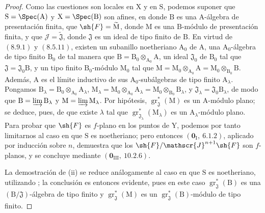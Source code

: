 \begin{proof}
Como las cuestiones son locales en $\mathrm{X}$ y en $\mathrm{S}$, podemos suponer que
$\mathrm{S}=\Spec(\mathrm{A})$ y $\mathrm{X}=\Spec(\mathrm{B})$ son afines,
en donde $\mathrm{B}$ es una $\mathrm{A}$-álgebra de presentación finita, que
$\sh{F}=\widetilde{\mathrm{M}}$, donde $\mathrm{M}$ es una
$\mathrm{B}$-módulo de presentación finita, y que
$\mathscr{J}=\widetilde{\mathfrak{J}}$, donde $\mathfrak{J}$ es un ideal
de tipo finito de $\mathrm{B}$. En virtud de $(8.9.1)$ y $(8.5.11)$,
existen un subanillo noetheriano $\mathrm{A}_0$ de $\mathrm{A}$, una
$\mathrm{A}_0$-álgebra de tipo finito $\mathrm{B}_0$ de tal manera que
$\mathrm{B}=\mathrm{B}_0\otimes_{\mathrm{A}_0}\mathrm{A}$, un ideal
$\mathfrak{J}_0$ de $\mathrm{B}_0$ tal que
$\mathfrak{J}=\mathfrak{J}_0\mathrm{B}$, y un tipo finito
$\mathrm{B}_0$-módulo $\mathrm{M}_0$ tal que
$\mathrm{M}=\mathrm{M}_0\otimes_{\mathrm{A}_0}\mathrm{A}
=\mathrm{M}_0\otimes_{\mathrm{B}_0}\mathrm{B}$. Además,
$\mathrm{A}$ es el límite inductivo de sus
$\mathrm{A}_0$-subálgebras de tipo finito $\mathrm{A}_\lambda$. Pongamos
$\mathrm{B}_\lambda=\mathrm{B}_0\otimes_{\mathrm{A}_0}\mathrm{A}_\lambda$,
$\mathrm{M}_\lambda=\mathrm{M}_0\otimes_{\mathrm{A}_0}\mathrm{A}_\lambda
=\mathrm{M}_0\otimes_{\mathrm{B}_0}\mathrm{B}_\lambda$, y
$\mathfrak{J}_\lambda=\mathfrak{J}_0\mathrm{B}_\lambda$, de modo que
$\mathrm{B}=\varinjlim\mathrm{B}_\lambda$ y
$\mathrm{M}=\varinjlim\mathrm{M}_\lambda$. Por hipótesis,
$\operatorname{gr}^*_\mathfrak{J}(\mathrm{M})$ es un
$\mathrm{A}$-módulo plano; se deduce, pues, de  que
existe $\lambda$ tal que
$\operatorname{gr}^*_{\mathfrak{J}_\lambda}(\mathrm{M}_\lambda)$ es un
$\mathrm{A}_\lambda$-módulo plano. Para probar que $\sh{F}$ es $f$-plano en
los puntos de $\mathrm{Y}$, podemos por tanto limitarnos al caso en que
$\mathrm{S}$ es noetheriano; pero entonces $(\mathbf{0}_\mathrm{I},~6.1.2)$,
aplicado por inducción sobre $n$, demuestra que los
$\sh{F}/\mathscr{J}^{n+1}\sh{F}$ son $f$-planos, y se concluye mediante
$(\mathbf{0}_{\mathrm{III}},~10.2.6)$.

La demostración de (ii) se reduce análogamente al caso en que $\mathrm{S}$ es noetheriano, utilizando ; la conclusión es entonces evidente, pues en este caso $\operatorname{gr}^*_\mathfrak{J}(\mathrm{B})$ es una $(\mathrm{B}/\mathfrak{J})$-álgebra de tipo finito y $\operatorname{gr}^*_\mathfrak{J}(\mathrm{M})$ es un $\operatorname{gr}^*_\mathfrak{J}(\mathrm{B})$-módulo de tipo finito.


\end{proof}
